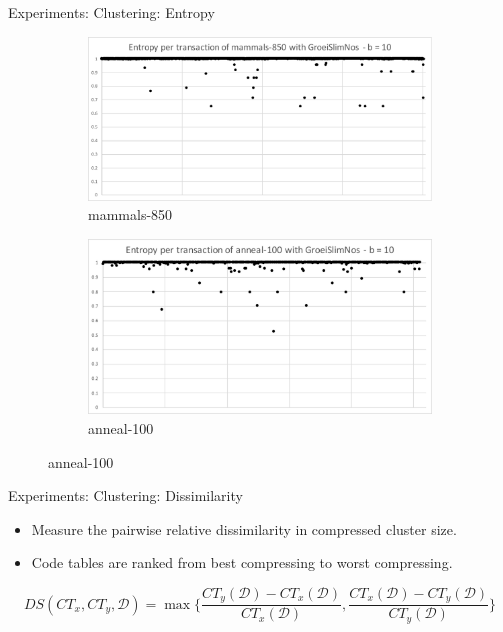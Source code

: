 \documentclass{beamer}
\newcommand{\codetable}{CT}
\newcommand{\dataset}{\mathcal{D}}
\begin{document}
\begin{frame}{Experiments: Clustering: Entropy}
\begin{figure}[H]
  \centering
  \begin{subfigure}[b]{0.6\textwidth}
    \includegraphics[width=\textwidth]{img/ent-mammals-850}
    \caption{mammals-850}
  \end{subfigure} 

  \begin{subfigure}[b]{0.6\textwidth}
    \includegraphics[width=\textwidth]{img/ent-anneal-100}
    \caption{anneal-100}
  \end{subfigure}
\end{figure}
\end{frame}

\begin{frame}{Experiments: Clustering: Dissimilarity}
	\begin{itemize}
		\item Measure the pairwise relative dissimilarity in compressed cluster size.
		\item Code tables are ranked from best compressing to worst compressing.
	\end{itemize}
\[ DS(\codetable_x,\codetable_y,\dataset) = \max\Bigg\{\frac{\codetable_y(\dataset) - \codetable_x(\dataset)}{\codetable_x(\dataset)}, \frac{\codetable_x(\dataset) - \codetable_y(\dataset)}{\codetable_y(\dataset)}\Bigg\} \]
\end{frame}
\end{document}
